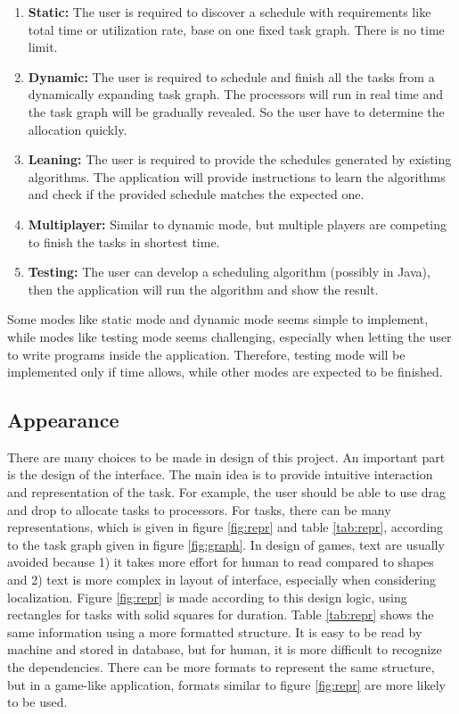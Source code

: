 \documentclass[a4paper,11pt]{article}
\begin{document}
\begin{enumerate}
    \item \textbf{Static:} The user is required to discover a schedule with requirements like total time or utilization rate, base on one fixed task graph. There is no time limit.
    \item \textbf{Dynamic:} The user is required to schedule and finish all the tasks from a dynamically expanding task graph. The processors will run in real time and the task graph will be gradually revealed. So the user have to determine the allocation quickly.
    \item \textbf{Leaning:} The user is required to provide the schedules generated by existing algorithms. The application will provide instructions to learn the algorithms and check if the provided schedule matches the expected one.
    \item \textbf{Multiplayer:} Similar to dynamic mode, but multiple players are competing to finish the tasks in shortest time.
    \item \textbf{Testing:} The user can develop a scheduling algorithm (possibly in Java), then the application will run the algorithm and show the result.
\end{enumerate}

Some modes like static mode and dynamic mode seems simple to implement, while modes like testing mode seems challenging, especially when letting the user to write programs inside the application. Therefore, testing mode will be implemented only if time allows, while other modes are expected to be finished.

\subsection{Appearance} \label{sec:aprc}

There are many choices to be made in design of this project. An important part is the design of the interface. The main idea is to provide intuitive interaction and representation of the task. For example, the user should be able to use drag and drop to allocate tasks to processors. For tasks, there can be many representations, which is given in figure \ref{fig:repr} and table \ref{tab:repr}, according to the task graph given in figure \ref{fig:graph}. In design of games, text are usually avoided because 1) it takes more effort for human to read compared to shapes and 2) text is more complex in layout of interface, especially when considering localization. Figure \ref{fig:repr} is made according to this design logic, using rectangles for tasks with solid squares for duration. Table \ref{tab:repr} shows the same information using a more formatted structure. It is easy to be read by machine and stored in database, but for human, it is more difficult to recognize the dependencies. There can be more formats to represent the same structure, but in a game-like application, formats similar to figure \ref{fig:repr} are more likely to be used.
\end{document}
